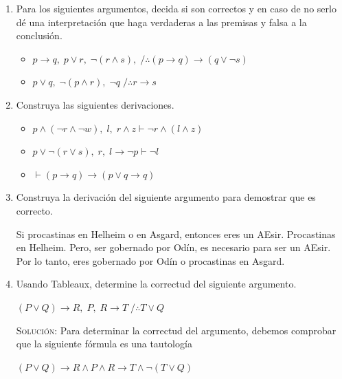 \documentclass[letterpaper,11pt]{article}
\begin{document}
\begin{enumerate}
    \item Para los siguientes argumentos, decida si son correctos y en caso de 
    no serlo dé una interpretación que haga verdaderas a las premisas y falsa 
    a la conclusión.

    \begin{itemize}
        \item $p → q, \; p \lor r, \; \neg (r \land s), \; /∴ (p → q) → 
               (q \lor \neg s)$
        \item $p \lor q, \; \neg (p \land r), \; \neg q \; /∴ r → s$
    \end{itemize}

    \item Construya las siguientes derivaciones.

    \begin{itemize}
        \item $p \land (\neg r \land \neg w), \; l, \; r \land z ⊢ \neg r 
               \land (l \land z)$
        \item $p \lor \neg(r \lor s), \; r, \; l → \neg p ⊢ \neg l$
        \item $⊢(p → q) → (p \lor q → q)$
    \end{itemize}

    \item Construya la derivación del siguiente argumento para demostrar que es 
    correcto.

    Si procastinas en Helheim o en Asgard, entonces eres un AEsir. Procastinas 
    en Helheim. Pero, ser gobernado por Odín, es necesario para ser un AEsir. 
    Por lo tanto, eres gobernado por Odín o procastinas en Asgard.

    \item Usando Tableaux, determine la correctud del siguiente argumento.

    \begin{center}
        $(P \lor Q) → R, \; P, \; R → T \; /∴ T \lor Q$
    \end{center}

    \textsc{Solución:} Para determinar la correctud del argumento, debemos 
    comprobar que la siguiente fórmula es una tautología

    \begin{center}
        $(P \lor Q) → R \land P \land R → T \land \neg (T \lor Q)$
    \end{center}


\end{enumerate}
\end{document}

